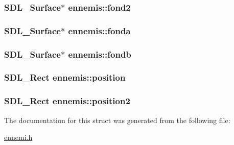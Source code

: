 \subsubsection[{\texorpdfstring{fond2}{fond2}}]{\setlength{\rightskip}{0pt plus 5cm}S\+D\+L\+\_\+\+Surface$\ast$ ennemis\+::fond2}\hypertarget{structennemis_a7cdce135302cefeedce69637c561ca87}{}\label{structennemis_a7cdce135302cefeedce69637c561ca87}
\subsubsection[{\texorpdfstring{fonda}{fonda}}]{\setlength{\rightskip}{0pt plus 5cm}S\+D\+L\+\_\+\+Surface$\ast$ ennemis\+::fonda}\hypertarget{structennemis_a0656bf1f2a05bd147d373d7eaa3f4285}{}\label{structennemis_a0656bf1f2a05bd147d373d7eaa3f4285}
\subsubsection[{\texorpdfstring{fondb}{fondb}}]{\setlength{\rightskip}{0pt plus 5cm}S\+D\+L\+\_\+\+Surface$\ast$ ennemis\+::fondb}\hypertarget{structennemis_aaef083b31ba478455bcbd16ed7235efb}{}\label{structennemis_aaef083b31ba478455bcbd16ed7235efb}
\subsubsection[{\texorpdfstring{position}{position}}]{\setlength{\rightskip}{0pt plus 5cm}S\+D\+L\+\_\+\+Rect ennemis\+::position}\hypertarget{structennemis_a3e8a9864c41c217f29e8fa94c3323414}{}\label{structennemis_a3e8a9864c41c217f29e8fa94c3323414}
\subsubsection[{\texorpdfstring{position2}{position2}}]{\setlength{\rightskip}{0pt plus 5cm}S\+D\+L\+\_\+\+Rect ennemis\+::position2}\hypertarget{structennemis_a25ac4c539f00f1d72a98164bbbe17f18}{}\label{structennemis_a25ac4c539f00f1d72a98164bbbe17f18}


The documentation for this struct was generated from the following file\+:\begin{DoxyCompactItemize}
\item 
\hyperlink{ennemi_8h}{ennemi.\+h}\end{DoxyCompactItemize}

